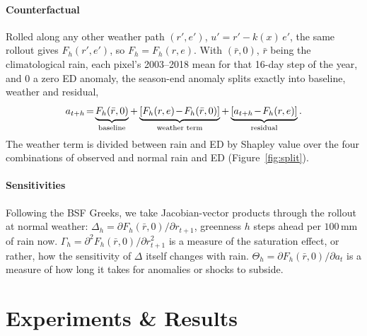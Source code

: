 \documentclass[letterpaper]{article} %
\begin{document}
\paragraph{Counterfactual} 

Rolled along any other weather path $(r',e')$, $u'=r'-k(x)\,e'$, the same rollout gives $F_h(r',e')$, so $F_h=F_h(r,e)$. With $(\bar r,0)$, $\bar r$ being the climatological rain, each pixel's 2003--2018 mean for that 16-day step of the year, and $0$ a zero ED anomaly, the season-end anomaly splits exactly into baseline, weather and residual,
\begin{equation}
\medmuskip=1.5mu\thickmuskip=2.5mu
a_{t+h}=\underbrace{F_h(\bar r,0)}_{\text{baseline}}+\underbrace{[F_h(r,e)-F_h(\bar r,0)]}_{\text{weather term}}+\underbrace{[a_{t+h}-F_h(r,e)]}_{\text{residual}}.
\label{eq:split}
\end{equation}
The weather term is divided between rain and ED by Shapley value over the four combinations of observed and normal rain and ED \citep{shapley1953} (Figure~\ref{fig:split}). 

\paragraph{Sensitivities}
Following the BSF Greeks, we take Jacobian-vector products through the rollout at normal weather: $\Delta_h=\partial F_h(\bar r,0)/\partial r_{t+1}$, greenness $h$ steps ahead per $100$\,mm of rain now. $\Gamma_h=\partial^2F_h(\bar r,0)/\partial r_{t+1}^2$ is a measure of the saturation effect, or rather, how the sensitivity of $\Delta$ itself changes with rain. $\Theta_h=\partial F_h(\bar r,0)/\partial a_t$ is a measure of how long it takes for anomalies or shocks to subside.

\section{Experiments \& Results}
\end{document}
